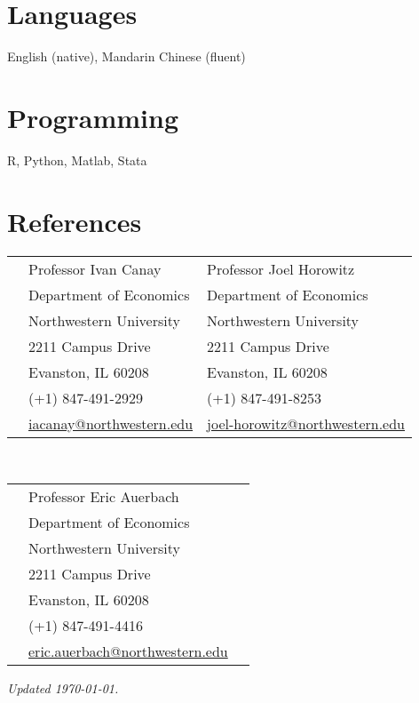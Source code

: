 \documentclass[margin,line]{res}
\newenvironment{list1}{
  \begin{list}{\ding{113}}{%
      \setlength{\itemsep}{.025in}
      \setlength{\parsep}{0in} \setlength{\parskip}{0in}
      \setlength{\topsep}{0in} \setlength{\partopsep}{0in}
      \setlength{\leftmargin}{0.17in}}}{\end{list}}
\begin{document}
\begin{resume}
\section{Languages}
\begin{list1}
\item[] English (native), Mandarin Chinese (fluent)
\end{list1}

\section{Programming}
\begin{list1}
\item[] R, Python, Matlab, Stata
\end{list1}

\newpage

\section{ References}
\vspace{.05in}
\begin{tabular}{@{}p{0.20in}p{2.75in}p{2.75in}}
 & Professor Ivan Canay          & Professor Joel Horowitz \\
 & Department of Economics   & Department of Economics \\
 & Northwestern University   & Northwestern University \\
 & 2211 Campus Drive  & 2211 Campus Drive  \\
 & Evanston, IL 60208  & Evanston, IL 60208\\
 & (+1) 847-491-2929  & (+1) 847-491-8253\\
 &  \href{mailto: iacanay@northwestern.edu}{iacanay@northwestern.edu} &  \href{mailto: joel-horowitz@northwestern.edu}{joel-horowitz@northwestern.edu} \\
\end{tabular}
\vspace{.1in} ~\\
\begin{tabular}{@{}p{0.20in}p{2.75in}p{2.75in}}
 & Professor Eric Auerbach            \\
 & Department of Economics   \\
 & Northwestern University    \\
 & 2211 Campus Drive    \\
 & Evanston, IL 60208  \\
 & (+1) 847-491-4416  \\
 &  \href{mailto: eric.auerbach@northwestern.edu}{eric.auerbach@northwestern.edu}  \\
\end{tabular}

\vfill
\begin{flushright}
\small \emph{Updated \mydate\today .}
\end{flushright}



\end{resume}
\end{document}
